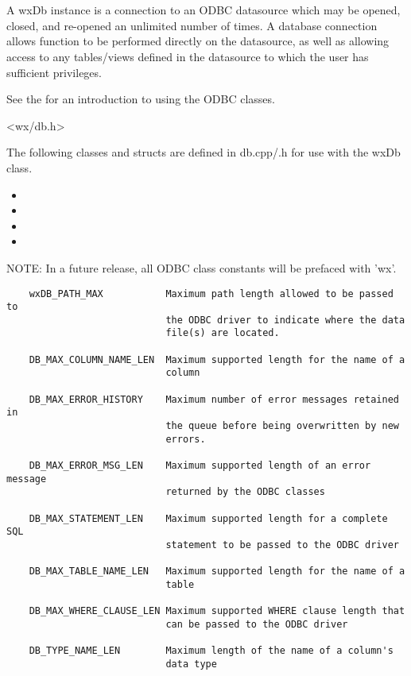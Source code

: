 \section{}\label{wxdb}

A wxDb instance is a connection to an ODBC datasource which may
be opened, closed, and re-opened an unlimited number of times.  A
database connection allows function to be performed directly on the
datasource, as well as allowing access to any tables/views defined in
the datasource to which the user has sufficient privileges.

See the  for
an introduction to using the ODBC classes.


<wx/db.h>


The following classes and structs are defined in db.cpp/.h for use with the wxDb class.

\begin{itemize}\itemsep=0pt
\item {}
\item {}
\item {}
\item {}
\end{itemize}


NOTE: In a future release, all ODBC class constants will be prefaced with 'wx'.

\begin{verbatim}
    wxDB_PATH_MAX           Maximum path length allowed to be passed to
                            the ODBC driver to indicate where the data
                            file(s) are located.

    DB_MAX_COLUMN_NAME_LEN  Maximum supported length for the name of a
                            column

    DB_MAX_ERROR_HISTORY    Maximum number of error messages retained in
                            the queue before being overwritten by new
                            errors.

    DB_MAX_ERROR_MSG_LEN    Maximum supported length of an error message
                            returned by the ODBC classes

    DB_MAX_STATEMENT_LEN    Maximum supported length for a complete SQL
                            statement to be passed to the ODBC driver

    DB_MAX_TABLE_NAME_LEN   Maximum supported length for the name of a
                            table

    DB_MAX_WHERE_CLAUSE_LEN Maximum supported WHERE clause length that
                            can be passed to the ODBC driver

    DB_TYPE_NAME_LEN        Maximum length of the name of a column's
                            data type
\end{verbatim}

